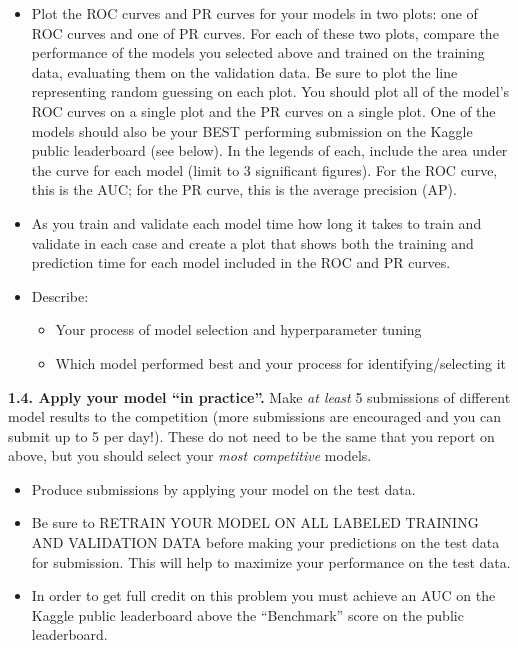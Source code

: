 \documentclass[
  letterpaper,
  DIV=11,
  numbers=noendperiod]{scrartcl}
\providecommand{\tightlist}{%
  \setlength{\itemsep}{0pt}\setlength{\parskip}{0pt}}\usepackage{longtable,booktabs,array}
\begin{document}
\begin{itemize}
\item
  Plot the ROC curves and PR curves for your models in two plots: one of
  ROC curves and one of PR curves. For each of these two plots, compare
  the performance of the models you selected above and trained on the
  training data, evaluating them on the validation data. Be sure to plot
  the line representing random guessing on each plot. You should plot
  all of the model's ROC curves on a single plot and the PR curves on a
  single plot. One of the models should also be your BEST performing
  submission on the Kaggle public leaderboard (see below). In the
  legends of each, include the area under the curve for each model
  (limit to 3 significant figures). For the ROC curve, this is the AUC;
  for the PR curve, this is the average precision (AP).
\item
  As you train and validate each model time how long it takes to train
  and validate in each case and create a plot that shows both the
  training and prediction time for each model included in the ROC and PR
  curves.
\item
  Describe:

  \begin{itemize}
  \tightlist
  \item
    Your process of model selection and hyperparameter tuning
  \item
    Which model performed best and your process for
    identifying/selecting it
  \end{itemize}
\end{itemize}

\textbf{1.4. Apply your model ``in practice''.} Make \emph{at least} 5
submissions of different model results to the competition (more
submissions are encouraged and you can submit up to 5 per day!). These
do not need to be the same that you report on above, but you should
select your \emph{most competitive} models.

\begin{itemize}
\tightlist
\item
  Produce submissions by applying your model on the test data.
\item
  Be sure to RETRAIN YOUR MODEL ON ALL LABELED TRAINING AND VALIDATION
  DATA before making your predictions on the test data for submission.
  This will help to maximize your performance on the test data.
\item
  In order to get full credit on this problem you must achieve an AUC on
  the Kaggle public leaderboard above the ``Benchmark'' score on the
  public leaderboard.
\end{itemize}
\end{document}
